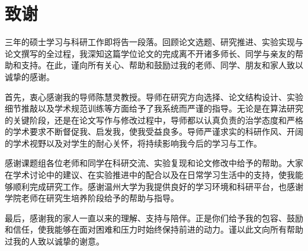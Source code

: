 \documentclass{wzuthesis} %
\def\blind{}       %
\begin{document}
\frontmatter
\makefirstpage

\mainmatter













\newpage

\backmatter
\renewcommand{\chaptermark}[1]{\markboth{\songti #1}{}}
\makereferences
\newpage


\newpage

\ifdefined\blind  %
\else
    \chapter{致谢}

    三年的硕士学习与科研工作即将告一段落。回顾论文选题、研究推进、实验实现与论文撰写的全过程，我深知这篇学位论文的完成离不开诸多师长、同学与亲友的帮助和支持。在此，谨向所有关心、帮助和鼓励过我的老师、同学、朋友和家人致以诚挚的感谢。

    首先，衷心感谢我的导师陈慧灵教授。导师在研究方向选择、论文结构设计、实验细节推敲以及学术规范训练等方面给予了我系统而严谨的指导。无论是在算法研究的关键阶段，还是在论文写作与修改过程中，导师都以认真负责的治学态度和严格的学术要求不断督促我、启发我，使我受益良多。导师严谨求实的科研作风、开阔的学术视野以及对学生的耐心关怀，将持续影响我今后的学习与工作。

    感谢课题组各位老师和同学在科研交流、实验复现和论文修改中给予的帮助。大家在学术讨论中的建议、在实验推进中的配合以及在日常学习生活中的支持，使我能够顺利完成研究工作。感谢温州大学为我提供良好的学习环境和科研平台，也感谢学院老师在研究生培养阶段给予的帮助与指导。

    最后，感谢我的家人一直以来的理解、支持与陪伴。正是你们给予我的包容、鼓励和信任，使我能够在面对困难和压力时始终保持前进的动力。谨以此文向所有帮助过我的人致以诚挚的谢意。
\end{document}
